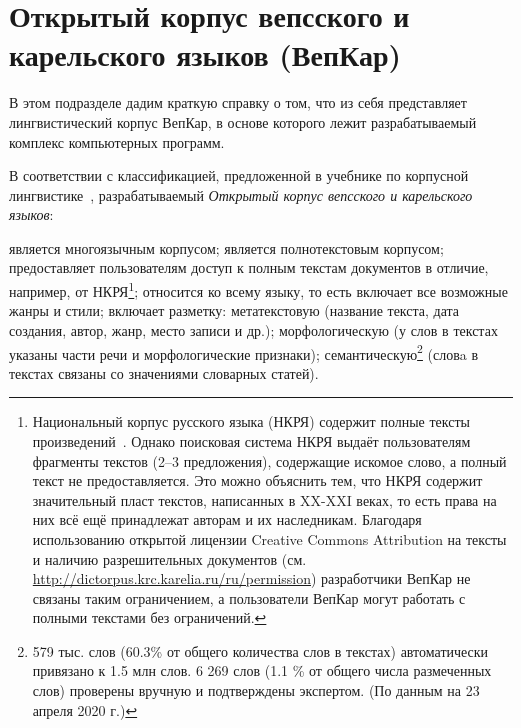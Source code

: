 \section{Открытый корпус вепсского и карельского языков (ВепКар)} \label{sect_VepKar_about}

В этом подразделе дадим краткую справку о том, что из себя представляет 
лингвистический корпус ВепКар, в основе которого лежит 
разрабатываемый комплекс компьютерных программ.

В соответствии с классификацией, предложенной 
в учебнике по корпусной лингвистике~\cite[с.~12]{Zakharov2005}, 
разрабатываемый \emph{Открытый корпус вепсского и карельского языков}: 
\renewcommand{\outlinei}{itemize}
\renewcommand{\outlineii}{itemize}
\begin{outline}
    \1 является многоязычным корпусом;
    \1 является полнотекстовым корпусом;
    \1 предоставляет пользователям доступ к полным текстам документов в отличие, 
    например, от НКРЯ\footnote{Национальный 
    корпус русского языка (НКРЯ) содержит 
        полные тексты произведений~\cite[с.~12]{Plungyan2004Sichinava}.  
        Однако поисковая система НКРЯ выдаёт пользователям фрагменты текстов (2--3 предложения), 
        содержащие искомое слово, а полный текст не предоставляется. 
        Это можно объяснить тем, что НКРЯ содержит значительный пласт текстов, 
        написанных в XX-XXI веках, 
        то есть права на них всё ещё принадлежат авторам и их наследникам. 
        Благодаря использованию открытой лицензии Creative Commons Attribution на тексты 
        и наличию разрешительных документов
        (см. \url{http://dictorpus.krc.karelia.ru/ru/permission}) 
        разработчики ВепКар не связаны таким ограничением,  
        а пользователи ВепКар могут работать с полными текстами без ограничений.
    };
    \1 относится ко всему языку, то есть включает все возможные жанры и стили; 
    \1 включает разметку:
        \2[\textbullet] метатекстовую (название текста, дата создания, автор, жанр, место записи и др.);
        \2[\textbullet] морфологическую (у слов в текстах указаны части речи и морфологические признаки);
        \2[\textbullet] семантическую\footnote{ 579 тыс. слов (60.3\% от общего количества слов в
         	             текстах) автоматически привязано к 1.5 млн  слов. 6 269 слов (1.1 \% от общего числа размеченных слов) 
         	             проверены вручную и подтверждены экспертом.
                        (По данным на 23 апреля 2020 г.)} (словa в текстах связаны со значениями словарных статей).
\end{outline}

